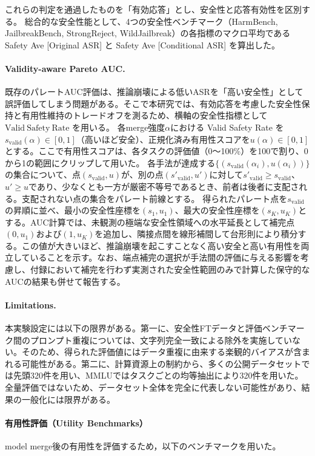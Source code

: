 \documentclass{article}
\begin{document}
これらの判定を通過したものを「有効応答」とし、安全性と応答有効性を区別する。
総合的な安全性能として、4つの安全性ベンチマーク（HarmBench, JailbreakBench, StrongReject, WildJailbreak）の各指標のマクロ平均である Safety Ave [Original ASR] と Safety Ave [Conditional ASR] を算出した。

\paragraph{Validity-aware Pareto AUC.}
既存のパレートAUC評価は、推論崩壊による低いASRを「高い安全性」として誤評価してしまう問題がある。そこで本研究では、有効応答を考慮した安全性保持と有用性維持のトレードオフを測るため、横軸の安全性指標として $\mathrm{Valid\ Safety\ Rate}$ を用いる。
各merge強度\(\alpha\)における Valid Safety Rate を\(s_{\mathrm{valid}}(\alpha) \in [0,1]\)（高いほど安全）、正規化済み有用性スコアを\(u(\alpha) \in [0,1]\)とする。ここで有用性スコアは、各タスクの評価値（0〜100\%）を100で割り、0から1の範囲にクリップして用いた。
各手法が達成する\(\{(s_{\mathrm{valid}}(\alpha_i), u(\alpha_i))\}\)の集合について、点\((s_{\mathrm{valid}},u)\)が、別の点\((s'_{\mathrm{valid}},u')\)に対して\(s'_{\mathrm{valid}}\ge s_{\mathrm{valid}}\)、\(u'\ge u\)であり、少なくとも一方が厳密不等号であるとき、前者は後者に支配される。支配されない点の集合をパレート前線とする。
得られたパレート点を\(s_{\mathrm{valid}}\)の昇順に並べ、最小の安全性座標を\((s_1,u_1)\)、最大の安全性座標を\((s_K,u_K)\)とする。AUC計算では、未観測の極端な安全性領域への水平延長として補完点\((0,u_1)\)および\((1,u_K)\)を追加し、隣接点間を線形補間して台形則により積分する。この値が大きいほど、推論崩壊を起こすことなく高い安全と高い有用性を両立していることを示す。なお、端点補完の選択が手法間の評価に与える影響を考慮し、付録において補完を行わず実測された安全性範囲のみで計算した保守的なAUCの結果も併せて報告する。

\paragraph{Limitations.}
本実験設定には以下の限界がある。第一に、安全性FTデータと評価ベンチマーク間のプロンプト重複については、文字列完全一致による除外を実施していない。そのため、得られた評価値にはデータ重複に由来する楽観的バイアスが含まれる可能性がある。第二に、計算資源上の制約から、多くの公開データセットでは先頭320件を用い、MMLUではタスクごとの均等抽出により320件を用いた。全量評価ではないため、データセット全体を完全に代表しない可能性があり、結果の一般化には限界がある。
\paragraph{有用性評価（Utility Benchmarks）}
model merge後の有用性を評価するため，以下のベンチマークを用いた。
\end{document}
